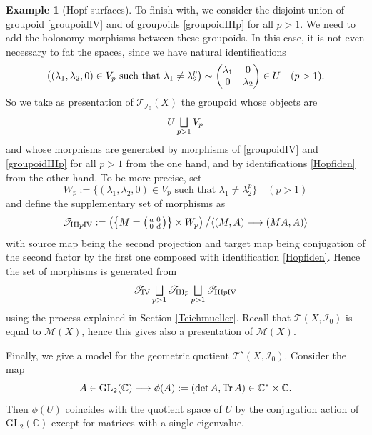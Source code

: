 \documentclass[JEP,XML,SOM,Unicode]{cedram}
\let\mathcal\mathscr
\let\oldbigsqcup\bigsqcup
\renewcommand{\bigsqcup}{\mathop{\textstyle\oldbigsqcup}\displaylimits}
\def\mto{\mathchoice{\longmapsto}{\mapsto}{\mapsto}{\mapsto}}
\newenvironment{smallpmatrix}{\big(\begin{smallmatrix}}{\end{smallmatrix}\big)}
\newcommand{\GL}{\mathrm{GL}}
\DeclareMathOperator{\Tr}{Tr}
\theoremstyle{plain}
\theoremstyle{definition}
\newtheorem{example}[theorem]{Example}
\theoremstyle{remark}
\numberwithin{equation}{section}
\newcommand{\CC}{{\mathbb{C}}}
\newcommand{\cI}{\mathcal{I}}
\let\uniondisjointe\bigsqcup
\begin{document}
\begin{example}[Hopf surfaces]
To finish with, we consider the disjoint union of groupoid \eqref{groupoidIV} and of groupoids \eqref{groupoidIIIp} for all $p>1$. We need to add the holonomy morphisms between these groupoids.
In this case, it is not even necessary to fat the spaces, since we have natural identifications
\begin{equation}
\label{Hopfiden}
\big ((\lambda_1,\lambda_2,0)\in V_p \text{ such that } \lambda_1\not = \lambda_2^p\big )\sim
\begin{pmatrix}
\lambda_1 &0\cr
0 &\lambda_2
\end{pmatrix}
\in U
\quad (p>1).
\end{equation}
So we take as presentation of $\mathcal T_{\cI_0} (X)$ the groupoid whose objects are
\begin{equation}
\label{Hopfobjects}
U\uniondisjointe_{p>1} V_p
\end{equation}
and whose morphisms are generated by morphisms of \eqref{groupoidIV} and \eqref{groupoidIIIp} for all $p>1$ from the one hand, and by identifications \eqref{Hopfiden} from the other hand. To be more precise, set
\begin{equation}
\label{morphismssuppHopf}
W_p:=\{(\lambda_1,\lambda_2,0)\in V_p \text{ such that } \lambda_1\not = \lambda_2^p\}\quad (p>1)
\end{equation}
and define the supplementary set of morphisms as
\begin{equation}
\label{TIIIpIV}
\mathcal T_{\mathrm{III}p\mathrm{IV}}:=\left (\left\{M=
\begin{smallpmatrix}
a &0\cr
0 &d
\end{smallpmatrix}
\right \}
\times W_p\right )\big / \langle (M,A)\mto (MA, A)\rangle
\end{equation}
with source map being the second projection and target map being conjugation of the second factor by the first one composed with identification \eqref{Hopfiden}.
Hence the set of morphisms is generated from
\begin{equation}
\label{morphismsHopf}
\mathcal T_\mathrm{IV}\uniondisjointe_{p>1}\mathcal T_{\mathrm{III}p}\uniondisjointe_{p>1}\mathcal T_{\mathrm{III}p\mathrm{IV}}
\end{equation}
using the process explained in Section \ref{Teichmueller}.
Recall that $\mathcal T(X,\cI_0)$ is equal to $\mathcal M(X)$, hence this gives also a presentation of $\mathcal M(X)$.

Finally, we give a model for the geometric quotient $\mathcal T^s(X,\cI_0)$. Consider the map
\begin{equation}
\label{dettrace}
A\in\GL_2(\CC)\mto \phi(A):=(\det A,\Tr A)\in\CC^*\times\CC.
\end{equation}
Then $\phi(U)$ coincides with the quotient space of $U$ by the conjugation action of $\GL_2(\CC)$ except for matrices with a single eigenvalue.


\end{example}
\end{document}
